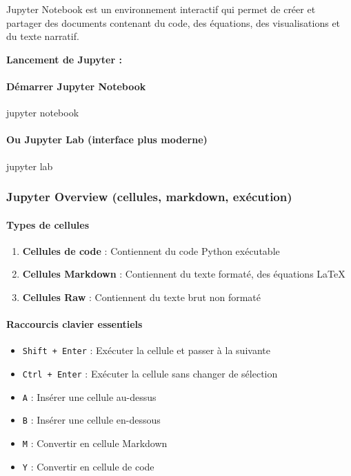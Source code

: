 \documentclass[11pt]{article}
\providecommand{\tightlist}{%
      \setlength{\itemsep}{0pt}\setlength{\parskip}{0pt}}
\begin{document}
Jupyter Notebook est un environnement interactif qui permet de créer et
partager des documents contenant du code, des équations, des
visualisations et du texte narratif.

\textbf{Lancement de Jupyter :}

    \paragraph{Démarrer Jupyter
Notebook}\label{duxe9marrer-jupyter-notebook}

jupyter notebook

\paragraph{Ou Jupyter Lab (interface plus
moderne)}\label{ou-jupyter-lab-interface-plus-moderne}

jupyter lab

    \subsubsection{Jupyter Overview (cellules, markdown,
exécution)}\label{jupyter-overview-cellules-markdown-exuxe9cution}

\paragraph{Types de cellules}\label{types-de-cellules}

\begin{enumerate}
\def\labelenumi{\arabic{enumi}.}
\tightlist
\item
  \textbf{Cellules de code} : Contiennent du code Python exécutable
\item
  \textbf{Cellules Markdown} : Contiennent du texte formaté, des
  équations LaTeX
\item
  \textbf{Cellules Raw} : Contiennent du texte brut non formaté
\end{enumerate}

\paragraph{Raccourcis clavier
essentiels}\label{raccourcis-clavier-essentiels}

\begin{itemize}
\tightlist
\item
  \texttt{Shift\ +\ Enter} : Exécuter la cellule et passer à la suivante
\item
  \texttt{Ctrl\ +\ Enter} : Exécuter la cellule sans changer de
  sélection
\item
  \texttt{A} : Insérer une cellule au-dessus
\item
  \texttt{B} : Insérer une cellule en-dessous
\item
  \texttt{M} : Convertir en cellule Markdown
\item
  \texttt{Y} : Convertir en cellule de code
\end{itemize}
\end{document}
